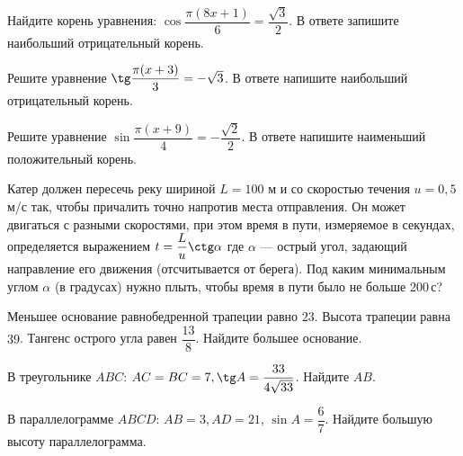 \begin{homework}[number=2]
	\begin{listofex}
		\item Найдите корень уравнения: \( \cos \dfrac{ \pi(8x+1) }{ 6 } = \dfrac{ \sqrt{3} }{ 2 } \). В ответе запишите наибольший отрицательный корень.
		\item Решите уравнение \( \tg \dfrac{ \pi(x+3) }{ 3 }=-\sqrt{3} \). В ответе напишите наибольший отрицательный корень.
		\item Решите уравнение \( \sin \dfrac{ \pi(x+9) }{ 4 }=-\dfrac{ \sqrt{2} }{ 2 } \). В ответе напишите наименьший положительный корень.
		\item Катер должен пересечь реку шириной \(L = 100\) м и со скоростью течения \(u =0,5\) м/с так, чтобы причалить точно напротив места отправления. Он может двигаться с разными скоростями, при этом время в пути, измеряемое в секундах, определяется выражением \(t=\dfrac{ L }{ u } \ctg \alpha \) где \(\alpha\) --- острый угол, задающий направление его движения (отсчитывается от берега). Под каким минимальным углом \(\alpha\) (в градусах) нужно плыть, чтобы время в пути было не больше \(200\) с?
		\item Меньшее основание равнобедренной трапеции равно \(23\). Высота трапеции равна \(39\). Тангенс острого угла равен \(\dfrac{ 13 }{ 8 }\). Найдите большее основание.
		\item В треугольнике \(ABC\): \(AC=BC=7, \tg A = \dfrac{ 33 }{ 4\sqrt{33} }\). Найдите \(AB\).
		\item В параллелограмме \(ABCD \): \( AB  =  3, AD  =  21\), \( \sin A = \dfrac{ 6 }{ 7 } \). Найдите большую высоту параллелограмма.
	\end{listofex}
\end{homework}

